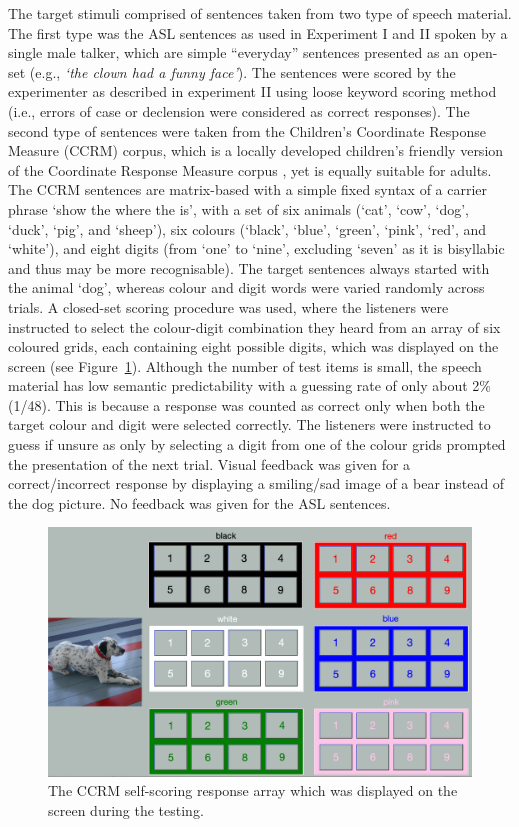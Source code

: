 \documentclass[a4paper, twoside]{templates/ociamthesis}
\begin{document}
\hfill\break
The target stimuli comprised of sentences taken from two type of speech material. The first type was the ASL sentences \autocite{MacLeod1990} as used in Experiment I and II spoken by a single male talker, which are simple ``everyday'' sentences presented as an open-set (e.g., \emph{`the clown had a funny face'}). The sentences were scored by the experimenter as described in experiment II using loose keyword scoring method (i.e., errors of case or declension were considered as correct responses). The second type of sentences were taken from the Children's Coordinate Response Measure (CCRM) corpus, which is a locally developed children's friendly version of the Coordinate Response Measure corpus \autocite[CRM;][]{Bolia2000}, yet is equally suitable for adults. The CCRM sentences are matrix-based with a simple fixed syntax of a carrier phrase `show the where the is', with a set of six animals (`cat', `cow', `dog', `duck', `pig', and `sheep'), six colours (`black', `blue', `green', `pink', `red', and `white'), and eight digits (from `one' to `nine', excluding `seven' as it is bisyllabic and thus may be more recognisable). The target sentences always started with the animal `dog', whereas colour and digit words were varied randomly across trials. A closed-set scoring procedure was used, where the listeners were instructed to select the colour-digit combination they heard from an array of six coloured grids, each containing eight possible digits, which was displayed on the screen (see Figure~\ref{fig:CCRM-scoring}). Although the number of test items is small, the speech material has low semantic predictability with a guessing rate of only about 2\% (1/48). This is because a response was counted as correct only when both the target colour and digit were selected correctly. The listeners were instructed to guess if unsure as only by selecting a digit from one of the colour grids prompted the presentation of the next trial. Visual feedback was given for a correct/incorrect response by displaying a smiling/sad image of a bear instead of the dog picture. No feedback was given for the ASL sentences.\\

\begin{figure}[ht]
\center
\includegraphics[width=\textwidth]{figures/Chapt1/CCRM_Scoring.PNG}
\caption{\label{fig:CCRM-scoring}{The CCRM self-scoring response array which was displayed on the screen during the testing.}}
\end{figure}
\end{document}
